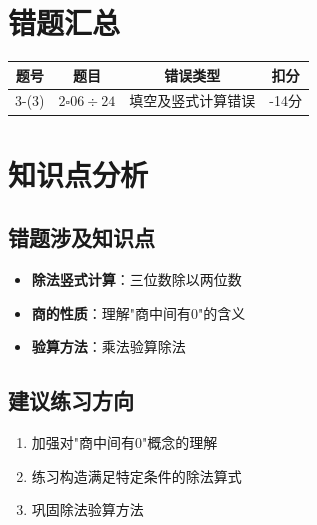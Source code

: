\documentclass[12pt,a4paper]{article}
\begin{document}
\section{错题汇总}

\begin{table}[h]
\centering
\begin{tabular}{|c|c|c|c|}
\hline
\textbf{题号} & \textbf{题目} & \textbf{错误类型} & \textbf{扣分} \\
\hline
3-(3) & $2\square06 \div 24$ & 填空及竖式计算错误 & -14分 \\
\hline
\end{tabular}
\end{table}

\section{知识点分析}

\subsection{错题涉及知识点}
\begin{itemize}
    \item \textbf{除法竖式计算}：三位数除以两位数
    \item \textbf{商的性质}：理解"商中间有0"的含义
    \item \textbf{验算方法}：乘法验算除法
\end{itemize}

\subsection{建议练习方向}
\begin{enumerate}
    \item 加强对"商中间有0"概念的理解
    \item 练习构造满足特定条件的除法算式
    \item 巩固除法验算方法
\end{enumerate}
\end{document}

